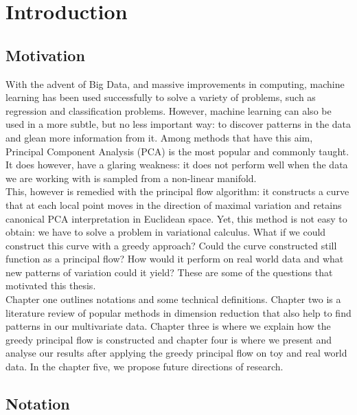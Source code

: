 \documentclass[12pt]{report}
\begin{document}
\newpage
\tableofcontents
\listoffigures
\newpage

\chapter{Introduction}

\section{Motivation}

With the advent of Big Data, and massive improvements in computing,
machine learning has been used successfully to solve a variety of problems, 
such as regression and classification problems. However, machine learning
can also be used in a more subtle, but no less important way: to discover patterns
in the data and glean more information from it. Among methods that have this aim, 
Principal Component Analysis (PCA) is the most popular and 
commonly taught. It does however, have a glaring weakness: it does 
not perform well when the data we are working with is sampled from a non-linear manifold.
\\
This, however is remedied with the principal flow algorithm: 
it constructs a curve that at each local point moves in the direction of
maximal variation and retains canonical PCA interpretation in Euclidean space.
Yet, this method is not easy to obtain: we have to solve a problem in variational calculus. 
What if we could construct this curve with a greedy approach? 
Could the curve constructed still function as a principal flow? 
How would it perform on real world data and what new patterns of variation could it 
yield? These are some of the questions that motivated this thesis.\\
Chapter one outlines notations and some technical definitions. 
Chapter two is a literature review of popular methods in dimension reduction that 
also help to find patterns in our multivariate data. 
Chapter three is where we explain how the greedy principal flow is constructed and 
chapter four is where we present and analyse
our results after applying the greedy principal flow on toy and real world data.
In the chapter five, we propose future directions of research.

\newpage

\section{Notation}
\end{document}
